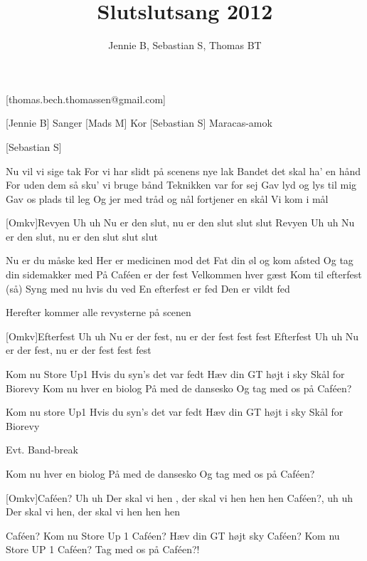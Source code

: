 \documentclass[a4paper,12pt]{article}
\title{Slutslutsang 2012}
\author{Jennie B, Sebastian S, Thomas BT}
\begin{document}
\maketitle

\begin{texxers}
[thomas.bech.thomassen@gmail.com]
\end{texxers}

\begin{roles}
	[Jennie B] Sanger
	[Mads M] Kor
	[Sebastian S] Maracas-amok
\end{roles}


\begin{props}
	[Sebastian S] 
\end{props}

\begin{song}

Nu vil vi sige tak
For vi har slidt på scenens nye lak
Bandet det skal ha' en hånd
For uden dem så sku' vi bruge bånd
Teknikken var for sej
Gav lyd og lys til mig
Gav os plads til leg
Og jer med tråd og nål
fortjener en skål
Vi kom i mål

[Omkv]Revyen Uh uh
Nu er den slut, nu er den slut slut slut
Revyen Uh uh
Nu er den slut, nu er den slut slut slut

Nu er du måske ked
Her er medicinen mod det
Fat din øl og kom afsted
Og tag din sidemakker med
På Caféen er der fest
Velkommen hver gæst
Kom til efterfest
(så) Syng med nu hvis du ved
En efterfest er fed
Den er vildt fed

\scene Herefter kommer alle revysterne på scenen

[Omkv]Efterfest Uh uh
Nu er der fest, nu er der fest fest fest
Efterfest Uh uh
Nu er der fest, nu er der fest fest fest

Kom nu Store Up1
Hvis du syn's det var fedt
Hæv din GT højt i sky
Skål for Biorevy
Kom nu hver en biolog
På med de dansesko
Og tag med os på Caféen?

Kom nu store Up1
Hvis du syn's det var fedt
Hæv din GT højt i sky
Skål for Biorevy

\scene Evt. Band-break

Kom nu hver en biolog
På med de dansesko
Og tag med os på Caféen?

[Omkv]Caféen? Uh uh
Der skal vi hen , der skal vi hen hen hen 
Caféen?, uh uh
Der skal vi hen, der skal vi hen hen hen

Caféen?
Kom nu Store Up 1
Caféen?
Hæv din GT højt sky
Caféen?
Kom nu Store UP 1
Caféen?
Tag med os på Caféen?!


\end{song}
\end{document}
